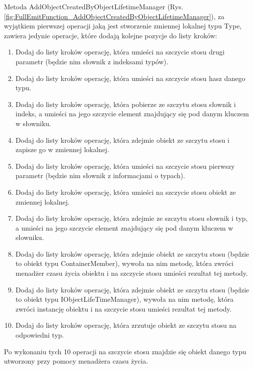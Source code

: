\documentclass[12pt]{article}
\begin{document}
Metoda AddObjectCreatedByObjectLifetimeManager (Rys. \ref{fig:FullEmitFunction_AddObjectCreatedByObjectLifetimeManager}), za wyjątkiem pierwszej operacji jaką jest stworzenie zmiennej lokalnej typu Type, zawiera jedynie operacje, które dodają kolejne pozycje do listy kroków:
\begin{enumerate}
	\item Dodaj do listy kroków operację, która umieści na szczycie stosu drugi parametr (będzie nim słownik z indeksami typów).
	\item Dodaj do listy kroków operację, która umieści na szczycie stosu hasz danego typu.
	\item Dodaj do listy kroków operację, która pobierze ze szczytu stosu słownik i indeks, a umieści na jego szczycie element znajdujący się pod danym kluczem w słowniku.
	\item Dodaj do listy kroków operację, która zdejmie obiekt ze szczytu stosu i zapisze go w zmiennej lokalnej.
	\item Dodaj do listy kroków operację, która umieści na szczycie stosu pierwszy parametr (będzie nim słownik z informacjami o typach).
	\item Dodaj do listy kroków operację, która umieści na szczycie stosu obiekt ze zmiennej lokalnej.
	\item Dodaj do listy kroków operację, która zdejmie ze szczytu stosu słownik i typ, a umieści na jego szczycie element znajdujący się pod danym kluczem w słowniku.
	\item Dodaj do listy kroków operację, która zdejmie obiekt ze szczytu stosu (będzie to obiekt typu ContainerMember), wywoła na nim metodę, która zwróci menadżer czasu życia obiektu i na szczycie stosu umieści rezultat tej metody.
	\item Dodaj do listy kroków operację, która zdejmie obiekt ze szczytu stosu (będzie to obiekt typu IObjectLifeTimeManager), wywoła na nim metodę, która zwróci instancję obiektu i na szczycie stosu umieści rezultat tej metody.
	\item Dodaj do listy kroków operację, która zrzutuje obiekt ze szczytu stosu na odpowiedni typ.
\end{enumerate}
Po wykonaniu tych 10 operacji na szczycie stosu znajdzie się obiekt danego typu utworzony przy pomocy menadżera czasu życia.\\ \\
\end{document}
